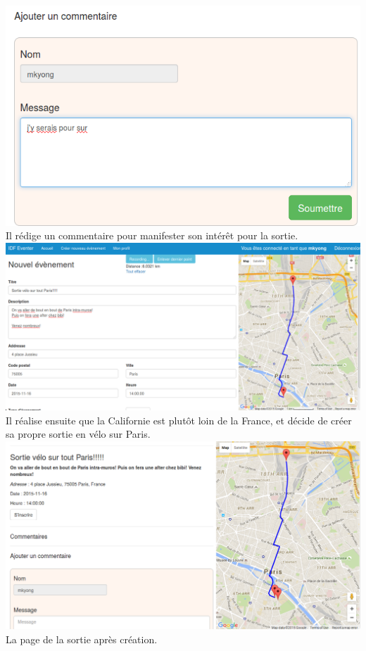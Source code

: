 \documentclass[11pt,a4paper,margin=0.5in]{report}
\begin{document}
\includegraphics[scale=0.5]{illus/comment.png} \\[0.25in]
Il rédige un commentaire pour manifester son intérêt pour la sortie. \\[0.25in]

\includegraphics[scale=0.33]{illus/neweventroute.png} \\[0.25in]
Il réalise ensuite que la Californie est plutôt loin de la France, et décide de créer sa propre sortie en vélo sur Paris. \\[0.25in]

\includegraphics[scale=0.4]{illus/newev.png} \\[0.25in]
La page de la sortie après création. \\[0.25in]
\end{document}
